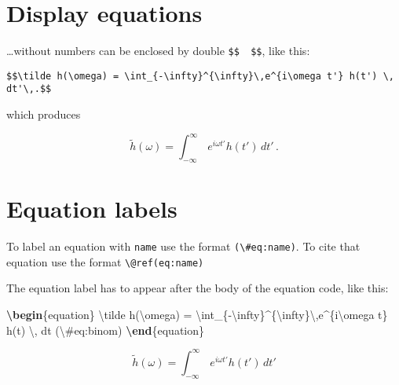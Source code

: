 \documentclass[
]{book}
\newenvironment{Shaded}{\begin{snugshade}}{\end{snugshade}}
\newcommand{\ExtensionTok}[1]{#1}
\newcommand{\KeywordTok}[1]{\textcolor[rgb]{0.13,0.29,0.53}{\textbf{#1}}}
\newcommand{\NormalTok}[1]{#1}
\newcommand{\SpecialCharTok}[1]{\textcolor[rgb]{0.00,0.00,0.00}{#1}}
\newcommand{\SpecialStringTok}[1]{\textcolor[rgb]{0.31,0.60,0.02}{#1}}
\begin{document}
\hypertarget{display-equations}{%
\section{Display equations}\label{display-equations}}

\ldots without numbers can be enclosed by double \texttt{\$\$\ \ \$\$}, like this:

\begin{verbatim}
$$\tilde h(\omega) = \int_{-\infty}^{\infty}\,e^{i\omega t'} h(t') \, dt'\,.$$
\end{verbatim}

which produces

\[\tilde h(\omega) = \int_{-\infty}^{\infty}\,e^{i\omega t'} h(t') \, dt'\,.\]

\hypertarget{equation-labels}{%
\section{Equation labels}\label{equation-labels}}

To label an equation with \texttt{name} use the format \texttt{(\textbackslash{}\#eq:name)}.
To cite that equation use the format \texttt{\textbackslash{}@ref(eq:name)}

The equation label has to appear after the body of the equation code, like this:

\begin{Shaded}
\begin{Highlighting}[]
\KeywordTok{\textbackslash{}begin}\NormalTok{\{}\ExtensionTok{equation}\NormalTok{\}}\SpecialStringTok{ }
\SpecialStringTok{  }\SpecialCharTok{\textbackslash{}tilde}\SpecialStringTok{ h(}\SpecialCharTok{\textbackslash{}omega}\SpecialStringTok{) = }\SpecialCharTok{\textbackslash{}int}\SpecialStringTok{\_\{{-}}\SpecialCharTok{\textbackslash{}infty}\SpecialStringTok{\}\^{}\{}\SpecialCharTok{\textbackslash{}infty}\SpecialStringTok{\}}\SpecialCharTok{\textbackslash{},}\SpecialStringTok{e\^{}\{i}\SpecialCharTok{\textbackslash{}omega}\SpecialStringTok{ t\textquotesingle{}\} h(t\textquotesingle{}) }\SpecialCharTok{\textbackslash{},}\SpecialStringTok{ dt\textquotesingle{}}
\SpecialStringTok{  (}\SpecialCharTok{\textbackslash{}\#}\SpecialStringTok{eq:binom)}
\KeywordTok{\textbackslash{}end}\NormalTok{\{}\ExtensionTok{equation}\NormalTok{\} }
\end{Highlighting}
\end{Shaded}

\begin{equation}
  \tilde h(\omega) = \int_{-\infty}^{\infty}\,e^{i\omega t'} h(t') \, dt'
  \label{eq:binom}
\end{equation}
\end{document}
